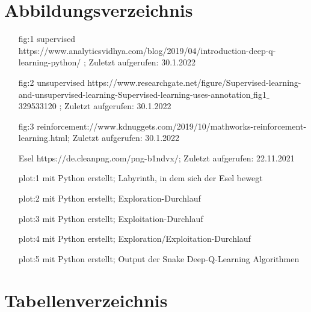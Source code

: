 \documentclass[12pt,titlepage]{article}
\begin{document}
\section{Abbildungsverzeichnis}
\begin{itemize}
\item[fig:1] supervised https://www.analyticsvidhya.com/blog/2019/04/introduction-deep-q-learning-python/ ; Zuletzt aufgerufen: 30.1.2022
\item[fig:2] unsupervised https://www.researchgate.net/figure/Supervised-learning-and-unsupervised-learning-Supervised-learning-uses-annotation$\_$fig1$\_$\\329533120 ; Zuletzt aufgerufen: 30.1.2022
\item[fig:3] reinforcement://www.kdnuggets.com/2019/10/mathworks-reinforcement-learning.html; Zuletzt aufgerufen: 30.1.2022
\item[Esel] https://de.cleanpng.com/png-b1ndvx/; Zuletzt aufgerufen: 22.11.2021
\item[plot:1] mit Python erstellt; Labyrinth, in dem sich der Esel bewegt
\item[plot:2] mit Python erstellt; Exploration-Durchlauf
\item[plot:3] mit Python erstellt; Exploitation-Durchlauf
\item[plot:4] mit Python erstellt; Exploration/Exploitation-Durchlauf
\item[plot:5] mit Python erstellt; Output der Snake Deep-Q-Learning Algorithmen
\end{itemize}

\section{Tabellenverzeichnis}
\listoftables
\end{document}
